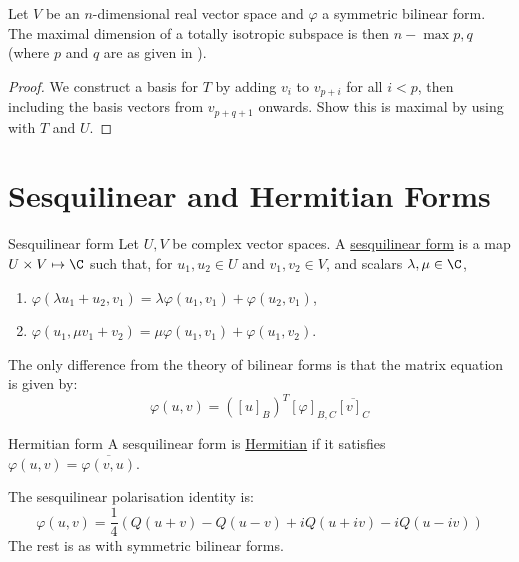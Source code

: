 \documentclass[../Main.tex]{subfiles}
\begin{document}
\begin{proposition}
    Let $V$ be an $n$-dimensional real vector space and $\varphi$ a symmetric bilinear form. The maximal dimension of a totally isotropic subspace is then $n - \max{p, q}$ (where $p$ and $q$ are as given in ).
    \label{propTISpaceMaxDim}
\end{proposition}
\begin{proof}
    We construct a basis for $T$ by adding $v_i$ to $v_{p + i}$ for all $i < p$, then including the basis vectors from $v_{p + q + 1}$ onwards. Show this is maximal by using  with $T$ and $U$.
\end{proof}
\section{Sesquilinear and Hermitian Forms}
\begin{definition}{Sesquilinear form}
    Let $U, V$ be complex vector spaces. A \underline{sesquilinear form} is a map $U \times V \mapsto \C$ such that, for $u_1, u_2 \in U$ and $v_1, v_2 \in V$, and scalars $\lambda, \mu \in \C$,
    \begin{enumerate}
        \item $\varphi(\lambda u_1 + u_2, v_1) = \lambda \varphi(u_1, v_1) + \varphi(u_2, v_1)$,
        \item $\varphi(u_1, \mu v_1 + v_2) = \mu \varphi(u_1, v_1) + \varphi(u_1, v_2)$.
    \end{enumerate}
\end{definition}
The only difference from the theory of bilinear forms is that the matrix equation is given by:
\begin{equation*}
    \varphi(u, v) = \left([u]_B\right)^T [\varphi]_{B, C} \overline{[v]_C}
\end{equation*}
\begin{definition}{Hermitian form}
    A sesquilinear form is \underline{Hermitian} if it satisfies $\varphi(u, v) = \overline{\varphi(v, u)}$.
\end{definition}
The sesquilinear polarisation identity is:
\begin{equation*}
    \varphi(u, v) = \frac14 \left(Q(u + v) - Q(u - v) + iQ(u + i v) - i Q(u - i v)\right)
\end{equation*}
The rest is as with symmetric bilinear forms.
\end{document}
